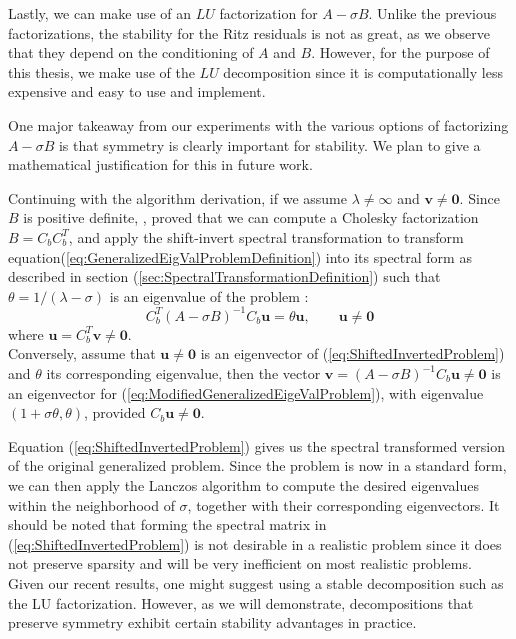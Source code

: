 Lastly, we can make use of an $LU$ factorization for $A-\sigma B$. Unlike the previous factorizations, the stability for the Ritz residuals is not as great, as we observe that they depend on the conditioning of $A$ and $B$. However, for the purpose of this thesis, we make use of the $LU$ decomposition since it is computationally less expensive and easy to use and implement.

One major takeaway from our experiments with the various options of factorizing $A-\sigma B$ is that symmetry is clearly important for stability. We plan to give a mathematical justification for this in future work.

Continuing with the algorithm derivation, if we assume $\lambda \neq \infty$ and $\mathbf{v} \neq \mathbf{0}$. Since $B$ is positive definite, \cite{stewart2024spectraltransformationdensesymmetric}, proved that we can compute a Cholesky factorization $B = C_bC_b^T$, and apply the shift-invert spectral transformation to transform equation(\ref{eq:GeneralizedEigValProblemDefinition}) into its spectral form as described in section (\ref{sec:SpectralTransformationDefinition}) such that $\theta = 1/(\lambda - \sigma)$ is an eigenvalue of the problem :
\begin{equation}\label{eq:ShiftedInvertedProblem}
	C_b^T (A-\sigma B)^{-1} C_b \mathbf{u} = \theta \mathbf{u}, \qquad \mathbf{u} \neq \mathbf{0}
\end{equation}
where  $\mathbf{u} = C_b^T \mathbf{v} \neq \mathbf{0}.$\\
Conversely, assume that $\mathbf{u} \neq \mathbf{0}$ is an eigenvector of (\ref{eq:ShiftedInvertedProblem}) and $\theta$ its corresponding eigenvalue, then the vector $\mathbf{v} = (A-\sigma B)^{-1}C_b \mathbf{u} \neq \mathbf{0}$ is an eigenvector for (\ref{eq:ModifiedGeneralizedEigeValProblem}), with eigenvalue $(1+\sigma \theta, \theta)$, provided $C_b\mathbf{u} \neq \mathbf{0}$.

  Equation (\ref{eq:ShiftedInvertedProblem}) gives us the spectral transformed version of the original generalized problem. Since the problem is now in a standard form, we can then apply the Lanczos algorithm to compute the desired eigenvalues within the neighborhood of $\sigma$, together with their corresponding eigenvectors. It should be noted that forming the spectral matrix in (\ref{eq:ShiftedInvertedProblem}) is not desirable in a realistic problem since it does not preserve sparsity and will be very inefficient on most realistic problems. Given our recent results, one might suggest using a stable decomposition such as the LU factorization. However, as we will demonstrate, decompositions that preserve symmetry exhibit certain stability advantages in practice.

